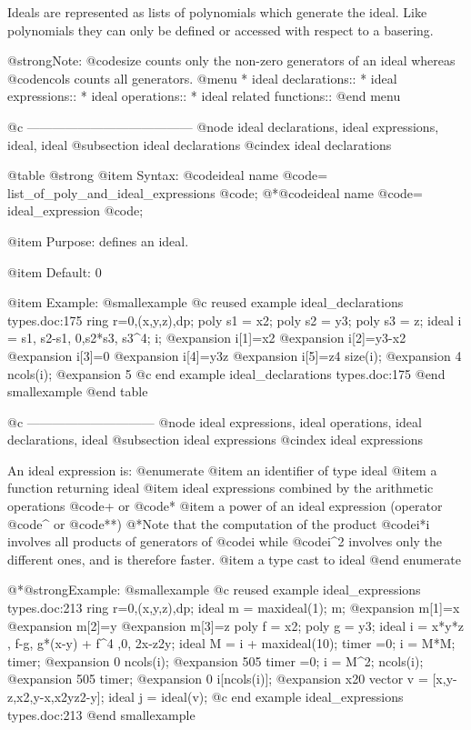 Ideals are represented as lists of polynomials which generate the ideal.
Like polynomials they
can only be defined or accessed with respect to a basering.

@strong{Note:} @code{size} counts only the non-zero generators of an ideal
whereas @code{ncols} counts all generators.
@menu
* ideal declarations::
* ideal expressions::
* ideal operations::
* ideal related functions::
@end menu

@c ---------------------------------------
@node ideal declarations, ideal expressions, ideal, ideal
@subsection ideal declarations
@cindex ideal declarations

@table @strong
@item Syntax:
@code{ideal} name @code{=} list_of_poly_and_ideal_expressions @code{;}
@*@code{ideal} name @code{=} ideal_expression @code{;}

@item Purpose:
defines an ideal.

@item Default:
0

@item Example:
@smallexample
@c reused example ideal_declarations types.doc:175 
  ring r=0,(x,y,z),dp;
  poly s1 = x2;
  poly s2 = y3;
  poly s3 = z;
  ideal i =  s1, s2-s1, 0,s2*s3, s3^4;
  i;
@expansion{} i[1]=x2
@expansion{} i[2]=y3-x2
@expansion{} i[3]=0
@expansion{} i[4]=y3z
@expansion{} i[5]=z4
  size(i);
@expansion{} 4
  ncols(i);
@expansion{} 5
@c end example ideal_declarations types.doc:175
@end smallexample
@end table

@c ------------------------------
@node ideal expressions, ideal operations, ideal declarations, ideal
@subsection ideal expressions
@cindex ideal expressions

An ideal expression is:
@enumerate
@item
an identifier of type ideal
@item
a function returning ideal
@item
ideal expressions combined by the arithmetic operations
@code{+} or @code{*}
@item
a power of an ideal expression (operator @code{^} or @code{**})
@*Note that the computation of the product @code{i*i} involves
all products of generators of @code{i} while @code{i^2} involves
only the different ones, and is therefore faster.
@item
a type cast to ideal
@end enumerate

@*@strong{Example:}
@smallexample
@c reused example ideal_expressions types.doc:213 
  ring r=0,(x,y,z),dp;
  ideal m = maxideal(1);
  m;
@expansion{} m[1]=x
@expansion{} m[2]=y
@expansion{} m[3]=z
  poly f = x2;
  poly g = y3;
  ideal i = x*y*z , f-g, g*(x-y) + f^4 ,0, 2x-z2y;
  ideal M = i + maxideal(10);
  timer =0;
  i = M*M;
  timer;
@expansion{} 0
  ncols(i);
@expansion{} 505
  timer =0;
  i = M^2;
  ncols(i);
@expansion{} 505
  timer;
@expansion{} 0
  i[ncols(i)];
@expansion{} x20
  vector v = [x,y-z,x2,y-x,x2yz2-y];
  ideal j = ideal(v);
@c end example ideal_expressions types.doc:213
@end smallexample

